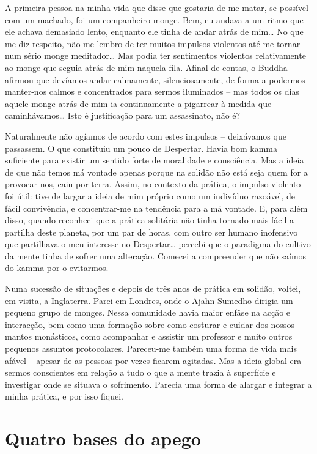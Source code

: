 A primeira pessoa na minha vida que disse que gostaria de me matar, se possível com um machado, foi um companheiro monge. Bem, eu andava a um ritmo que ele achava demasiado lento, enquanto ele tinha de andar atrás de mim\ldots{} No que me diz respeito, não me lembro de ter muitos impulsos violentos até me tornar num sério monge meditador\ldots{} Mas podia ter sentimentos violentos relativamente ao monge que seguia atrás de mim naquela fila. Afinal de contas, o Buddha afirmou que devíamos andar calmamente, silenciosamente, de forma a podermos manter-nos calmos e concentrados para sermos iluminados -- mas todos os dias aquele monge atrás de mim ia continuamente a pigarrear à medida que caminhávamos\ldots{} Isto é justificação para um assassinato, não é?

Naturalmente não agíamos de acordo com estes impulsos -- deixávamos que passassem. O que constituiu um pouco de Despertar. Havia bom kamma suficiente para existir um sentido forte de moralidade e consciência. Mas a ideia de que não temos má vontade apenas porque na solidão não está seja quem for a provocar-nos, caiu por terra. Assim, no contexto da prática, o impulso violento foi útil: tive de largar a ideia de mim próprio como um indivíduo razoável, de fácil convivência, e concentrar-me na tendência para a má vontade. E, para além disso, quando reconheci que a prática solitária não tinha tornado mais fácil a partilha deste planeta, por um par de horas, com outro ser humano inofensivo que partilhava o meu interesse no Despertar\ldots{} percebi que o paradigma do cultivo da mente tinha de sofrer uma alteração. Comecei a compreender que não saímos do kamma por o evitarmos.

Numa sucessão de situações e depois de três anos de prática em solidão, voltei, em visita, a Inglaterra. Parei em Londres, onde o Ajahn Sumedho dirigia um pequeno grupo de monges. Nessa comunidade havia maior enfâse na acção e interacção, bem como uma formação sobre como costurar e cuidar dos nossos mantos monásticos, como acompanhar e assistir um professor e muito outros pequenos assuntos protocolares. Pareceu-me também uma forma de vida mais afável -- apesar de as pessoas por vezes ficarem agitadas. Mas a ideia global era sermos conscientes em relação a tudo o que a mente trazia à superfície e investigar onde se situava o sofrimento. Parecia uma forma de alargar e integrar a minha prática, e por isso fiquei.

\section{Quatro bases do apego}


